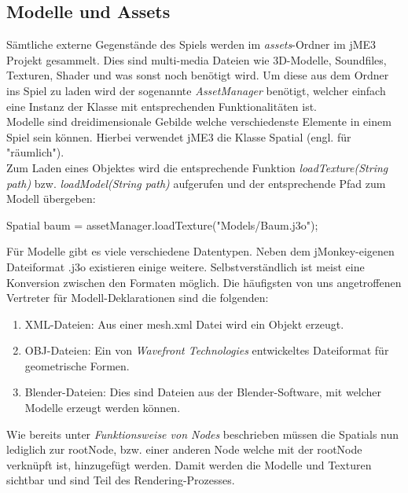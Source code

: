 \subsection{Modelle und Assets}
Sämtliche externe Gegenstände des Spiels werden im \emph{assets}-Ordner im jME3 Projekt gesammelt. Dies sind multi-media Dateien wie 3D-Modelle, Soundfiles, Texturen, Shader und was sonst noch benötigt wird.
Um diese aus dem Ordner ins Spiel zu laden wird der sogenannte \emph{AssetManager} benötigt, welcher einfach eine Instanz der Klasse mit entsprechenden Funktionalitäten ist. \\Modelle sind dreidimensionale Gebilde welche verschiedenste Elemente in einem Spiel sein können. Hierbei verwendet jME3 die Klasse Spatial (engl. für "räumlich"). \\Zum Laden eines Objektes wird die entsprechende Funktion \emph{loadTexture(String path)} bzw. \emph{loadModel(String path)} aufgerufen und der entsprechende Pfad zum Modell übergeben:
\begin{center}
{Spatial baum = assetManager.loadTexture("Models/Baum.j3o");}
\end{center} Für Modelle gibt es viele verschiedene Datentypen. Neben dem jMonkey-eigenen Dateiformat .j3o existieren einige weitere. Selbstverständlich ist meist eine Konversion zwischen den Formaten möglich. Die häufigsten von uns angetroffenen Vertreter für Modell-Deklarationen sind die folgenden:
\begin{enumerate}
	\item XML-Dateien: Aus einer mesh.xml Datei wird ein Objekt erzeugt. 
	\item OBJ-Dateien: Ein von \emph{Wavefront Technologies} entwickeltes Dateiformat für geometrische Formen. \cite{OBJ1}
	\item Blender-Dateien: Dies sind Dateien aus der Blender-Software, mit welcher Modelle erzeugt werden können.
\end{enumerate} Wie bereits unter \emph{Funktionsweise von Nodes} beschrieben müssen die Spatials nun lediglich zur rootNode, bzw. einer anderen Node welche mit der rootNode verknüpft ist, hinzugefügt werden. Damit werden die Modelle und Texturen sichtbar und sind Teil des Rendering-Prozesses.


